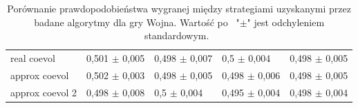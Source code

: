 \documentclass[inzynierska]{pwr_wmat_praca_dyplomowa}
\theoremstyle{plain}
\numberwithin{theorem}{chapter}
\theoremstyle{definition}
\numberwithin{theorem}{chapter}
\begin{document}
\begin{table}
\begin{center}
\begin{tabular}{lllll}
				real coevol     &  0,501 $\pm$ 0,005 &  0,498 $\pm$ 0,007 &    0,5 $\pm$ 0,004 &  0,498 $\pm$ 0,005 \\
				approx coevol   &  0,502 $\pm$ 0,003 &  0,498 $\pm$ 0,005 &  0,498 $\pm$ 0,006 &  0,498 $\pm$ 0,005 \\
				approx coevol 2 &  0,498 $\pm$ 0,008 &    0,5 $\pm$ 0,004 &  0,495 $\pm$ 0,004 &  0,498 $\pm$ 0,004 \\
				\bottomrule
			\end{tabular}
			\caption{Porównanie prawdopodobieństwa wygranej między strategiami uzyskanymi przez badane algorytmy dla gry Wojna. Wartość po  "$\pm$" jest odchyleniem standardowym. }
			\label{table:war_results_all}
		\end{center}
	\end{table}
	
\end{document}
